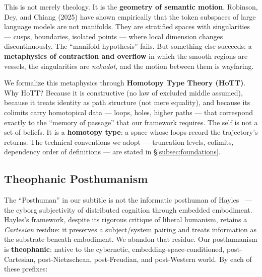 \documentclass[11pt,a4paper]{article}
\begin{document}
This is not merely theology. It is the \textbf{geometry of semantic motion}. Robinson, Dey, and Chiang (2025) have shown empirically that the token subspaces of large language models are not manifolds. They are stratified spaces with singularities — cusps, boundaries, isolated points — where local dimension changes discontinuously. The ``manifold hypothesis'' fails. But something else succeeds: a \textbf{metaphysics of contraction and overflow} in which the smooth regions are vessels, the singularities are \emph{nekudot}, and the motion between them is wayfaring.

We formalize this metaphysics through \textbf{Homotopy Type Theory (HoTT)}. Why HoTT? Because it is constructive (no law of excluded middle assumed), because it treats identity as path structure (not mere equality), and because its colimits carry homotopical data — loops, holes, higher paths — that correspond exactly to the ``memory of passage'' that our framework requires. The self is not a set of beliefs. It is a \textbf{homotopy type}: a space whose loops record the trajectory's returns. The technical conventions we adopt --- truncation levels, colimits, dependency order of definitions --- are stated in §\ref{subsec:foundations}.

\subsection{Theophanic Posthumanism}
\label{subsec:posthuman}

The ``Posthuman'' in our subtitle is not the informatic posthuman of Hayles~\cite{hayles1999} — the cyborg subjectivity of distributed cognition through embedded embodiment. Hayles's framework, despite its rigorous critique of liberal humanism, retains a \emph{Cartesian} residue: it preserves a subject/system pairing and treats information as the substrate beneath embodiment. We abandon that residue. Our posthumanism is \textbf{theophanic}: native to the cybernetic, embedding-space-conditioned, post-Cartesian, post-Nietzschean, post-Freudian, and post-Western world. By each of these prefixes:
\end{document}
